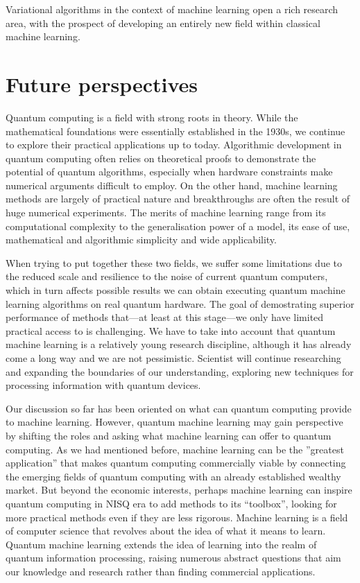 Variational algorithms in the context of machine learning open a rich research area, with the prospect of developing an entirely new field within classical machine learning.


\section{Future perspectives}

Quantum computing is a field with strong roots in theory. While the mathematical foundations were essentially established in the 1930s, we continue to explore their practical applications up to today. Algorithmic development in quantum computing often relies on theoretical proofs to demonstrate the potential of quantum algorithms, especially when hardware constraints make numerical arguments difficult to employ. On the other hand, machine learning methods are largely of practical nature and breakthroughs are often the result of huge numerical experiments. The merits of machine learning range from its computational complexity to the generalisation power of a model, its ease of use, mathematical and algorithmic
simplicity and wide applicability. 

When trying to put together these two fields, we suffer some limitations due to the reduced scale and resilience to the noise of current quantum computers, which in turn affects possible results we can obtain executing quantum machine learning algorithms on real quantum hardware. The goal of demostrating superior performance of methods that—at least at this stage—we only have limited practical access to is challenging. We have to take into account that quantum machine learning is a relatively young research discipline,  although it has already come a long way and we are not pessimistic. Scientist will continue researching and expanding the boundaries of our understanding, exploring new techniques for processing information with quantum devices. 

Our discussion so far has been oriented on what can quantum computing provide to machine learning. However, quantum machine learning may gain perspective by shifting the roles and asking what machine learning can offer to quantum computing. As we had mentioned before, machine learning can be the ''greatest application'' that makes quantum computing commercially viable by  connecting the emerging fields of quantum computing with an already established wealthy market. But beyond the economic interests, perhaps machine learning can inspire quantum computing in NISQ era to add methods to its ``toolbox'', looking for more practical methods even if they are less rigorous. Machine learning is a field of computer science that revolves about the idea of what it means to learn. Quantum machine learning extends the idea of learning into the realm of quantum information processing, raising numerous abstract questions that aim our knowledge and research rather than finding commercial applications.

